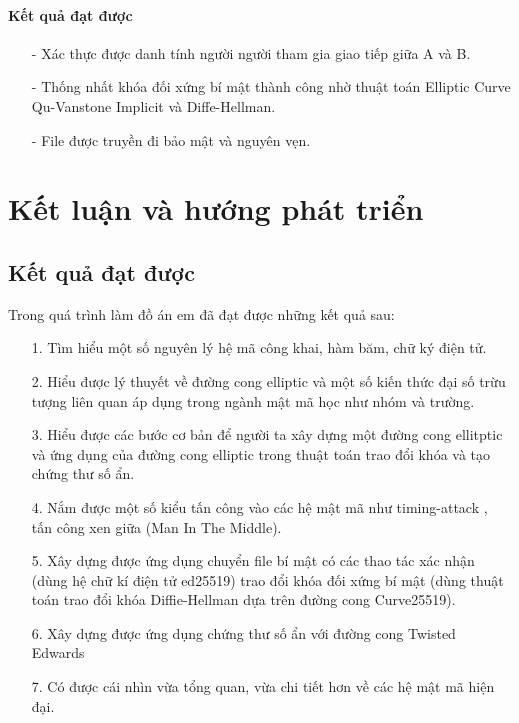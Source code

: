 \documentclass[a4paper,12pt]{report}
\begin{document}
\subsubsection*{Kết quả đạt được}
\begin{itemize}
\item[-] Xác thực được danh tính người người tham gia giao tiếp giữa A và B.
\item[-] Thống nhất khóa đối xứng bí mật thành công nhờ thuật toán Elliptic Curve Qu-Vanstone Implicit và Diffe-Hellman.
\item[-] File được truyền đi bảo mật và nguyên vẹn.
\end{itemize}
\chapter*{Kết luận và hướng phát triển}
\section*{Kết quả đạt được}
Trong quá trình làm đồ án em đã đạt được những kết quả sau:
\begin{itemize}
\item[1. ] Tìm hiểu một số nguyên lý hệ mã công khai, hàm băm, chữ ký điện tử.
\item[2. ] Hiểu được lý thuyết về đường cong elliptic và một số kiến thức đại số trừu tượng liên quan áp dụng trong ngành mật mã học như nhóm và trường.
\item[3. ] Hiểu được các bước cơ bản để người ta xây dựng một đường cong ellitptic và ứng dụng của đường cong elliptic trong thuật toán trao đổi khóa và tạo chứng thư số ẩn.
\item[4. ] Nắm được một số kiểu tấn công vào các hệ mật mã như timing-attack , tấn công xen giữa (Man In The Middle).
\item[5. ] Xây dựng được ứng dụng chuyển file bí mật có các thao tác xác nhận (dùng hệ chữ kí điện tử ed25519) trao đổi khóa đối xứng bí mật (dùng thuật toán trao đổi khóa Diffie-Hellman dựa trên đường cong Curve25519).
\item[6. ] Xây dựng được ứng dụng chứng thư số ẩn với đường cong Twisted Edwards
\item[7. ] Có được cái nhìn vừa tổng quan, vừa chi tiết hơn về các hệ mật mã hiện đại.
\end{itemize}
\end{document}
